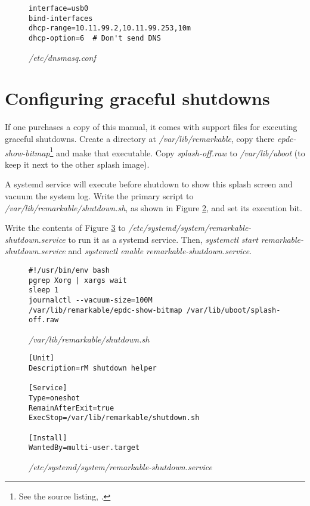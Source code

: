 \documentclass{memoir}
\begin{document}
\begin{figure}[h]
\begin{verbatim}
interface=usb0
bind-interfaces
dhcp-range=10.11.99.2,10.11.99.253,10m
dhcp-option=6  # Don't send DNS
\end{verbatim}
\caption{\textit{/etc/dnsmasq.conf}}
\label{fig:dnsmasqconf}
\end{figure}


\section{Configuring graceful shutdowns}
If one purchases a copy of this manual, it comes with support files for executing graceful shutdowns. Create a directory at \textit{/var/lib/remarkable}, copy there \textit{epdc-show-bitmap}\footnote{See the source listing, .} and make that executable. Copy \textit{splash-off.raw} to \textit{/var/lib/uboot} (to keep it next to the other splash image).

A systemd service will execute before shutdown to show this splash screen and vacuum the system log. Write the primary script to \textit{/var/lib/remarkable/shutdown.sh}, as shown in Figure \ref{fig:shutdown.sh}, and set its execution bit.

Write the contents of Figure \ref{fig:shutdown.service} to \textit{/etc/systemd/system/remarkable-shutdown.service} to run it as a systemd service. Then, \textit{systemctl start remarkable-shutdown.service} and \textit{systemctl enable remarkable-shutdown.service}.

\begin{figure}[h]
\begin{verbatim}
#!/usr/bin/env bash
pgrep Xorg | xargs wait
sleep 1
journalctl --vacuum-size=100M
/var/lib/remarkable/epdc-show-bitmap /var/lib/uboot/splash-off.raw
\end{verbatim}
\caption{\textit{/var/lib/remarkable/shutdown.sh}}
\label{fig:shutdown.sh}
\end{figure}

\begin{figure}[h]
\begin{verbatim}
[Unit]
Description=rM shutdown helper

[Service]
Type=oneshot
RemainAfterExit=true
ExecStop=/var/lib/remarkable/shutdown.sh

[Install]
WantedBy=multi-user.target
\end{verbatim}
\caption{\textit{/etc/systemd/system/remarkable-shutdown.service}}
\label{fig:shutdown.service}
\end{figure}
\end{document}
